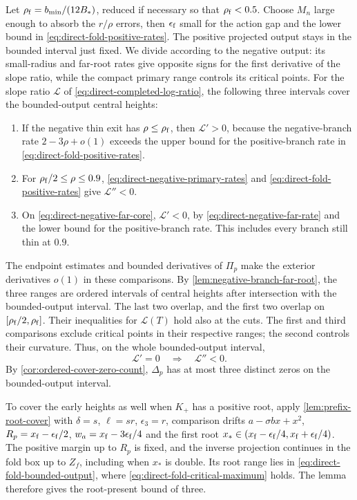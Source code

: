 Let \(\rho_{\rm f}=b_{\min}/(12B_*)\), reduced if necessary
so that \(\rho_{\rm f}<0.5\). Choose \(M_n\) large enough
to absorb the \(r/\rho\) errors, then \(\epsilon_{\rm f}\) small for
the action gap and the lower bound in
\eqref{eq:direct-fold-positive-rates}.
The positive projected output stays in the bounded interval just fixed.
We divide according to the negative output: its small-radius and far-root rates give
opposite signs for the first derivative of the slope ratio, while
the compact primary range controls its critical points.
For the slope ratio \(\mathcal L\) of \eqref{eq:direct-completed-log-ratio},
the following three intervals cover the bounded-output central heights:
\begin{enumerate}[label=(\roman*)]
\item If the negative thin exit has \(\rho\le\rho_{\rm f}\),
then \(\mathcal L'>0\), because the negative-branch rate
\(2-3\rho+o(1)\) exceeds the upper bound for the positive-branch rate in
\eqref{eq:direct-fold-positive-rates}.
\item For \(\rho_{\rm f}/2\le\rho\le0.9\),
\eqref{eq:direct-negative-primary-rates} and
\eqref{eq:direct-fold-positive-rates} give
\(\mathcal L''<0\).
\item On \eqref{eq:direct-negative-far-core},
\(\mathcal L'<0\), by
\eqref{eq:direct-negative-far-rate} and the lower bound for the
positive-branch rate. This includes every branch still thin at \(0.9\).
\end{enumerate}
The endpoint estimates and bounded derivatives of \(\Pi_p\) make the
exterior derivatives \(o(1)\) in these comparisons.
By \cref{lem:negative-branch-far-root}, the three ranges are ordered
intervals of central heights after intersection with the bounded-output
interval. The last two overlap, and the first two overlap on
\([\rho_{\rm f}/2,\rho_{\rm f}]\). Their inequalities for
\(\mathcal L(T)\) hold also at the cuts.
The first and third comparisons exclude critical points in their
respective ranges; the second controls their curvature. Thus, on the
whole bounded-output interval,
\begin{equation}
\label{eq:direct-fold-critical-maximum}
 \mathcal L'=0\quad\Longrightarrow\quad\mathcal L''<0.
\end{equation}
By \cref{cor:ordered-cover-zero-count}, \(\Delta_p\) has at most three
distinct zeros on the bounded-output interval.

To cover the early heights as well when \(K_+\) has a positive root,
apply \cref{lem:prefix-root-cover}
with \(\delta=s\), \(\ell=sr\), \(\epsilon_3=r\), comparison drifts
\(a-\sigma bx+x^2\), \(R_p=x_{\rm f}-\epsilon_{\rm f}/2\),
\(w_a=x_{\rm f}-3\epsilon_{\rm f}/4\) and the first root
\(x_*\in(x_{\rm f}-\epsilon_{\rm f}/4,x_{\rm f}+\epsilon_{\rm f}/4)\).
The positive margin up to \(R_p\) is fixed, and the inverse projection
continues in the fold box up to \(Z_f\), including when \(x_*\) is double.
Its root range lies in \eqref{eq:direct-fold-bounded-output}, where
\eqref{eq:direct-fold-critical-maximum} holds. The lemma therefore gives
the root-present bound of three.
